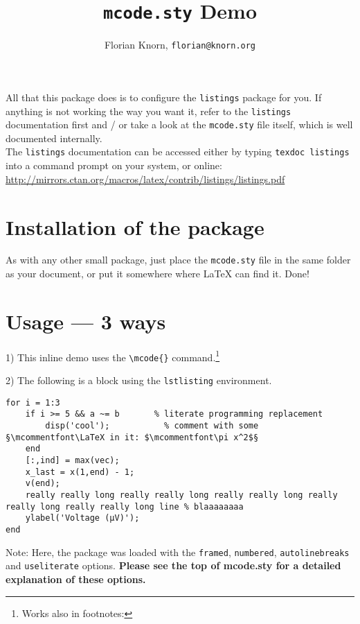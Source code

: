 \documentclass{article}
\title{\texttt{mcode.sty} Demo}
\author{Florian Knorn, \texttt{florian@knorn.org}}
\begin{document}
\maketitle

\begin{center}
\begin{minipage}{.75\linewidth}

	All that this package does is to configure the \verb|listings| package for you. If anything is not working the way you want it, refer to the \verb|listings| documentation first and / or take a look at the \verb|mcode.sty| file itself, which is well documented internally.\\
	
	The \verb|listings| documentation can be accessed either by typing \verb|texdoc listings| into a command prompt on your system, or online:\\\scriptsize\url{http://mirrors.ctan.org/macros/latex/contrib/listings/listings.pdf}
	
\end{minipage}
\end{center}

\section*{Installation of the package}

As with any other small package, just place the \verb|mcode.sty| file in the same folder as your document, or put it somewhere where \LaTeX{} can find it.  Done!

\medskip

\section*{Usage --- 3 ways}

1) This inline demo  uses the \verb|\mcode{}| command.\footnote{Works also in footnotes: }

2) The following is a block using the \verb|lstlisting| environment.
\begin{lstlisting}
for i = 1:3
	if i >= 5 && a ~= b       % literate programming replacement
		disp('cool');           % comment with some §\mcommentfont\LaTeX in it: $\mcommentfont\pi x^2$§
	end
	[:,ind] = max(vec);
	x_last = x(1,end) - 1;
	v(end);
	really really long really really long really really long really really long really really long line % blaaaaaaaa
	ylabel('Voltage (µV)');
end
\end{lstlisting}
Note: Here, the package was loaded with the \verb|framed|, \verb|numbered|, \verb|autolinebreaks| and \verb|useliterate| options.  \textbf{Please see the top of mcode.sty for a detailed explanation of these options.}
\end{document}
